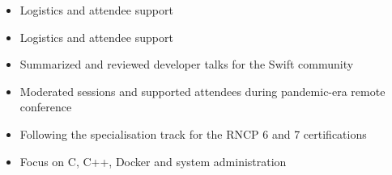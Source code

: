 \documentclass[10pt,a4paper,withhyper]{altacv}
\begin{document}
\begin{paracol}{2}
\divider



\begin{itemize}
\item Logistics and attendee support
\end{itemize}
\divider

\begin{itemize}
\item Logistics and attendee support
\end{itemize}
\divider

\begin{itemize}
\item Summarized and reviewed developer talks for the Swift community
\end{itemize}
\divider

\begin{itemize}
\item Moderated sessions and supported attendees during pandemic-era remote conference
\end{itemize}
\divider

\switchcolumn




\begin{itemize}
  \item Following the specialisation track for the RNCP 6 and 7 certifications
\end{itemize}
\divider

\begin{itemize}
  \item Focus on C, C++, Docker and system administration
\end{itemize}
\divider







\end{paracol}
\end{document}
